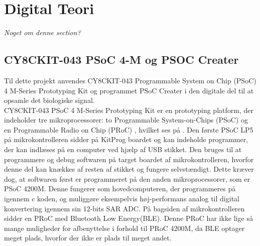 \section{Digital Teori}
\textit{Noget om denne section?}

\subsection{CY8CKIT-043 PSoC 4-M og PSOC Creater}
Til dette projekt anvendes CY8CKIT-043 Programmable System on Chip (PSoC) 4 M-Series Prototyping Kit og programmet PSoC Creater i den digitale del til at opsamle det biologiske signal.\\
CY8CKIT-043 PSoC 4 M-Series Prototyping Kit er en prototyping platform, der indeholder tre mikroprocessorer: to Programmable System-on-Chips (PSoC) og en Programmable Radio on Chip (PRoC)%
, hvilket ses på . Den første PSoC LP5 på mikrokontrolleren sidder på KitProg boardet og kan indeholde programmer, der kan indlæses på en computer ved hjælp af USB stikket. Den bruges til at programmere og debug softwaren på target boardet af mikrokontrolleren, hvorfor denne del kan knækkes af resten af stikket og fungere selvstændigt. Dette kræver dog, at softwaren først er programmeret på den anden mikroprocessorer, som er PSoC 4200M. Denne fungerer som hovedcomputeren, der programmeres på igennem c koden, og muliggøre eksempelvis høj-performans analog til digital konvertering igennem sin 12-bits SAR ADC. På bagsiden af mikrokontrolleren sidder en PRoC med Bluetooth Low Energy(BLE). Denne PRoC har ikke lige så mange muligheder for afbenyttelse i forhold til PRoC 4200M, da BLE optager meget plads, hvorfor der ikke er plads til meget andet. \citep{CYPRESS2016PSoC,Semiconductor2016,CYPRESS2016Cortexm0}
